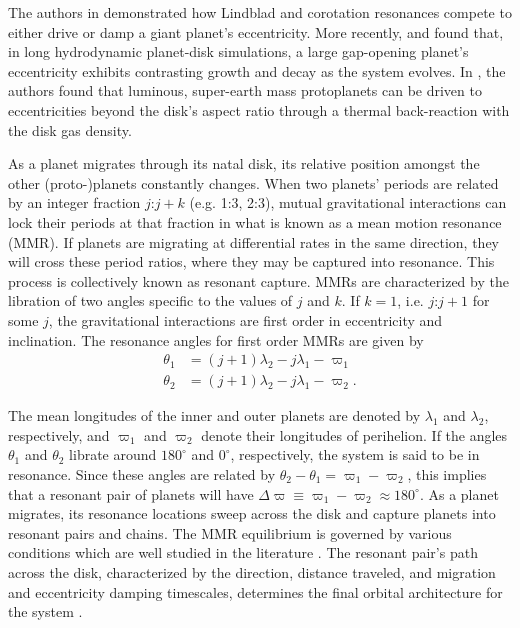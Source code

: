 \documentclass[usenatbib,twocolumn]{mnras}
\begin{document}
The authors in \cite{goldreich03_eccen_evolut_planet_gaseous_disks}
demonstrated how Lindblad and corotation resonances compete to either
drive or damp a giant planet's eccentricity.  More recently,
\citet{teyssandier17_secul_evolut_eccen_protop_discs} and
\citet{ragusa17_eccen_evolut_durin_planet_disc_inter} found that, in
long hydrodynamic planet-disk simulations, a large gap-opening
planet's eccentricity exhibits contrasting growth and decay as the
system evolves.  In
\citet{romero21_eccen_drivin_pebbl_accret_low_mass_planet}, the authors
found that luminous, super-earth mass protoplanets can be driven to
eccentricities beyond the disk's aspect ratio through a thermal
back-reaction with the disk gas density.

As a planet migrates through its natal disk, its relative position
amongst the other (proto-)planets constantly changes.  When two
planets' periods are related by an integer fraction \(j\):\(j+k\)
(e.g. 1:3, 2:3), mutual gravitational interactions can lock their
periods at that fraction in what is known as a mean motion resonance
(MMR).  If planets are migrating at differential rates in the same
direction, they will cross these period ratios, where they may be
captured into resonance.  This process is collectively known as
resonant capture.  MMRs are characterized by the libration of two
angles specific to the values of \(j\) and \(k\).  If \(k=1\),
i.e. \(j\):\(j+1\) for some \(j\), the gravitational interactions are first
order in eccentricity and inclination.  The resonance angles for first
order MMRs are given by
\begin{align}
\label{circangles1}
 \theta_1 &= (j+1)\lambda_2 - j\lambda_1 - \varpi_1 \\
\label{circangles2}
 \theta_2 &= (j+1)\lambda_2 - j\lambda_1 - \varpi_2.
\end{align}

\noindent The mean longitudes of the inner and outer planets
are denoted by \(\lambda_1\) and \(\lambda_2\), respectively, and
\(\varpi_1\) and \(\varpi_2\) denote their longitudes of perihelion.  If
the angles \(\theta_1\) and \(\theta_2\) librate around \(180^\circ\) and
\(0^\circ\), respectively, the system is said to be in resonance.  Since
these angles are related by \(\theta_2-\theta_1=\varpi_1-\varpi_2\),
this implies that a resonant pair of planets will have
\(\Delta\varpi\equiv \varpi_1-\varpi_2\approx 180^\circ\).  As a planet
migrates, its resonance locations sweep across the disk and capture
planets into resonant pairs and chains.  The MMR equilibrium is
governed by various conditions which are well studied in the
literature
\citep{henrard_second_1983,deck_migration_2015,goldreich_overstable_2014,xu_migration_2018}.
The resonant pair's path across the disk, characterized by the
direction, distance traveled, and migration and eccentricity damping
timescales, determines the final orbital architecture for the system
\citep{cresswell_evolution_2006,cresswell_three-dimensional_2008}.
\end{document}
